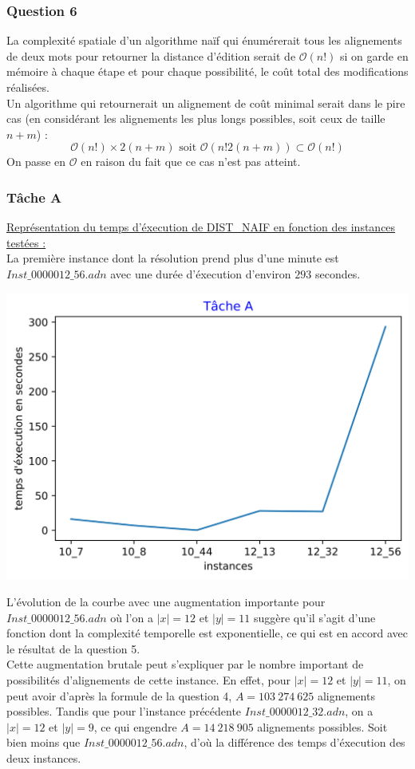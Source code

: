 \documentclass[12pt, a4paper]{report}
\begin{document}
\subsubsection{Question 6}
La complexité spatiale d'un algorithme naïf qui énumérerait tous les alignements de deux mots pour retourner la distance d'édition serait de $\mathcal{O}(n!)$ si on garde en mémoire à chaque étape et pour chaque possibilité, le coût total des modifications réalisées.\\
Un algorithme qui retournerait un alignement de coût minimal serait dans le pire cas (en considérant les alignements les plus longs possibles, soit ceux de taille $n+m$) :
$$\mathcal{O}(n!) \times 2(n+m) \text{ soit }\mathcal{O}(n!2(n+m)) \subset \mathcal{O}(n!)$$
On passe en $\mathcal{O}$ en raison du fait que ce cas n'est pas atteint.
\subsubsection{Tâche A}
\underline{Représentation du temps d'éxecution de DIST\_NAIF en fonction des instances testées :}\\
La première instance dont la résolution prend plus d'une minute est $Inst\_0000012\_56.adn$ avec une durée d'éxecution d'environ $293$ secondes. \\
\begin{center}
\includegraphics[scale=0.75]{TA.png}
\end{center}
L'évolution de la courbe avec une augmentation importante pour $Inst\_0000012\_56.adn$ où l'on a $|x|=12$ et $|y|=11$ suggère qu'il s'agit d'une fonction dont la complexité temporelle est exponentielle, ce qui est en accord avec le résultat de la question 5.\\Cette augmentation brutale peut s'expliquer par le nombre important de possibilités d'alignements de cette instance. En effet, pour $|x|=12$ et $|y|=11$, on peut avoir d'après la formule de la question 4, $A=103\ 274\ 625$ alignements possibles. Tandis que pour l'instance précédente $Inst\_0000012\_32.adn$, on a $|x|=12$ et $|y|=9$, ce qui engendre $A=14\ 218\ 905$ alignements possibles. Soit bien moins que $Inst\_0000012\_56.adn$, d'où la différence des temps d'éxecution des deux instances.\\
\end{document}
